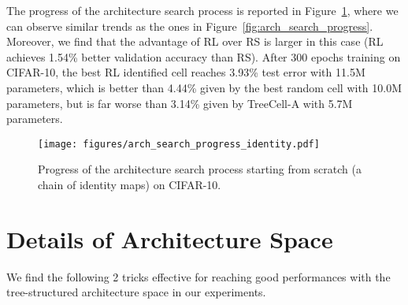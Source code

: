 \documentclass{article}
\begin{document}
The progress of the architecture search process is reported in Figure~\ref{fig:arch_search_progress_identity}, where we can observe similar trends as the ones in Figure~\ref{fig:arch_search_progress}. Moreover, we find that the advantage of RL over RS is larger in this case (RL achieves 1.54\% better validation accuracy than RS). After 300 epochs training on CIFAR-10, the best RL identified cell reaches 3.93\% test error with 11.5M parameters, which is better than 4.44\% given by the best random cell with 10.0M parameters, but is far worse than 3.14\% given by TreeCell-A with 5.7M parameters.  

\begin{table}[h]
	\centering
	\caption{Start point network with identity mappings on CIFAR-10.}\label{tab:identity_start_point}
	\vspace{5pt}
\end{table}

\begin{figure}[h]
	\centering
	\texttt{[image: figures/arch\_search\_progress\_identity.pdf]}
	\caption{Progress of the architecture search process starting from scratch (a chain of identity maps) on CIFAR-10.}
	\label{fig:arch_search_progress_identity}
\end{figure}

\section{Details of Architecture Space}
We find the following 2 tricks effective for reaching good performances with the tree-structured architecture space in our experiments. 
\end{document}
